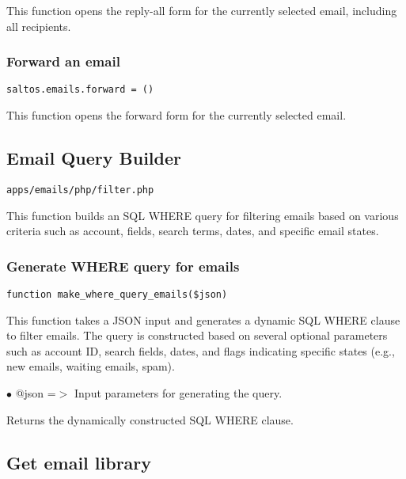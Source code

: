 \documentclass[a4paper]{article}
\begin{document}
This function opens the reply-all form for the currently selected email, including all recipients.

\hypertarget{toc65}{}
\subsubsection{Forward an email}

\begin{lstlisting}
saltos.emails.forward = ()
\end{lstlisting}

This function opens the forward form for the currently selected email.

\hypertarget{toc66}{}
\subsection{Email Query Builder}

\begin{lstlisting}
apps/emails/php/filter.php
\end{lstlisting}

This function builds an SQL WHERE query for filtering emails based on various criteria
such as account, fields, search terms, dates, and specific email states.

\hypertarget{toc67}{}
\subsubsection{Generate WHERE query for emails}

\begin{lstlisting}
function make_where_query_emails($json)
\end{lstlisting}

This function takes a JSON input and generates a dynamic SQL WHERE clause to filter emails.
The query is constructed based on several optional parameters such as account ID, search fields,
dates, and flags indicating specific states (e.g., new emails, waiting emails, spam).

\begin{compactitem}
\item[\color{myblue}$\bullet$] @json =$>$ Input parameters for generating the query.
\end{compactitem}

Returns the dynamically constructed SQL WHERE clause.

\hypertarget{toc68}{}
\subsection{Get email library}
\end{document}

